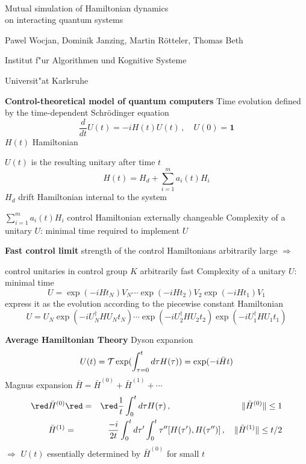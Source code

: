 \documentclass[portrait]{seminar}
\newcommand{\onemat}{{\mathbf 1}}
\begin{document}
\begin{slide}
{$ $}
\vfill
\begin{center}
{\Large \blue Mutual simulation of Hamiltonian dynamics\\ on interacting
quantum systems}

\vfill Pawel Wocjan, Dominik Janzing, Martin R{\"o}tteler, Thomas Beth

{\small Institut f"ur Algorithmen und Kognitive Systeme}

{\small Universit"at Karlsruhe}
\end{center}
\vfill
\end{slide}

\begin{slide}
{\large {\bf Control-theoretical model of quantum computers}}
\vfill
{\blue Time evolution} defined by the {\blue
time-dependent Schr\"odinger equation}
\[
\frac{d}{dt} U(t) = -i H(t) U(t)\,,\quad U(0)=\onemat
\]
$H(t)$ Hamiltonian 

$U(t)$ is the resulting unitary after time $t$
\vfill
\[
H(t) = H_d + \sum_{i=1}^m a_i(t) H_i
\]
$H_d$ {\blue drift Hamiltonian} internal to the system

$\sum_{i=1}^m a_i(t) H_i$ {\blue control Hamiltonian} externally
changeable
\vfill
{\red Complexity of a unitary $U$}: minimal time required to implement
$U$
\vfill
\end{slide}

\begin{slide}
{\large {\bf Fast control limit}}
\vfill
strength of the control Hamiltonians arbitrarily large $\Longrightarrow$

{\blue control unitaries in control group $K$} arbitrarily fast
\vfill
{\red Complexity of a unitary $U$}: minimal time
\[
U=\exp(-i H t_N) V_N \cdots \exp(-i H t_2) V_2 \exp(-i H t_1) V_1
\]
\vfill
express it as the evolution according to the piecewise constant Hamiltonian
\[
U = U_N \exp(-i U_N^\dagger H U_N t_N) \cdots \exp(-i U_2^\dagger H U_2 t_2)
    \exp(-i U_1^\dagger H U_1 t_1)
\]
\vfill
\end{slide}


\begin{slide}
{\large {\bf Average Hamiltonian Theory}}
\vfill
{\blue Dyson expansion}
\[
U(t)={\cal T} \exp(\int_{\tau=0}^t d\tau H(\tau))=\exp(-i\bar{H}t)
\]
\vfill
{\blue Magnus expansion} $\bar{H}=\bar{H}^{(0)}+\bar{H}^{(1)}+\cdots$
\begin{eqnarray*}
{\red\bar{H}^{(0)}} & {\red =} & {\red \frac{1}{t}\int_0^t d\tau
H(\tau)\,,\quad\quad\quad\quad\ \quad\quad\quad\quad
\|\bar{H}^{(0)}\|\le 1} \\
\bar{H}^{(1)} & = & \frac{-i}{2t}\int_0^t
d\tau' \int_0^t\tau'' [H(\tau'),H(\tau'')]\,,\quad
\|\bar{H}^{(1)}\|\le t/2
\end{eqnarray*}
\vfill
{\red $\Longrightarrow$ $U(t)$ essentially determined by $\bar{H}^{(0)}$ for
small $t$}
\vfill
\end{slide}
\end{document}
